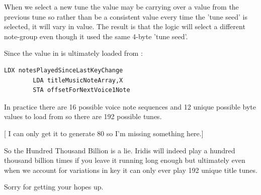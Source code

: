 When we select a new tune the value  may be carrying over a value from the previous tune so
rather than be a consistent value every time the 'tune seed' is selected, it will vary in value. The result is that the
logic will select a different note-group even though it used the same 4-byte 'tune seed'.

Since the value in  is ultimately loaded from :

\begin{lstlisting}[caption=\icode{offsetForNextVoice1Note} is loaded from \icode{titleMusicNoteArray} and is propagated down
to \icode{offsetForNextVoice3Note}.]
        LDX notesPlayedSinceLastKeyChange
        LDA titleMusicNoteArray,X
        STA offsetForNextVoice1Note
\end{lstlisting}

In practice there are 16 possible voice note sequences and 12 unique possible byte values to load from 
so there are 192 possible tunes.

[ I can only get it to generate 80 so I'm missing something here.]

So the Hundred Thousand Billion is a lie. Iridis will indeed play a hundred thousand billion times if you 
leave it running long enough but ultimately even when we account for variations in key it can only ever play
192 unique title tunes.

Sorry for getting your hopes up.



